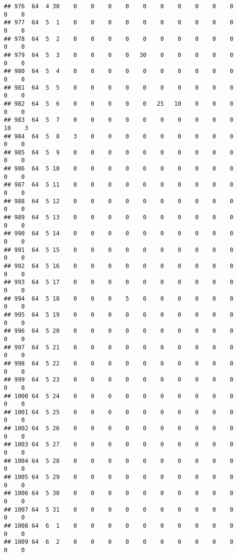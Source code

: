\documentclass[]{article}
\begin{document}
\begin{verbatim}
## 976  64  4 30    0    0    0    0    0    0    0    0    0    0    0    0
## 977  64  5  1    0    0    0    0    0    0    0    0    0    0    0    0
## 978  64  5  2    0    0    0    0    0    0    0    0    0    0    0    0
## 979  64  5  3    0    0    0    0   30    0    0    0    0    0    0    0
## 980  64  5  4    0    0    0    0    0    0    0    0    0    0    0    0
## 981  64  5  5    0    0    0    0    0    0    0    0    0    0    0    0
## 982  64  5  6    0    0    0    0    0   25   10    0    0    0    0    0
## 983  64  5  7    0    0    0    0    0    0    0    0    0    0   10    3
## 984  64  5  8    3    0    0    0    0    0    0    0    0    0    0    0
## 985  64  5  9    0    0    0    0    0    0    0    0    0    0    0    0
## 986  64  5 10    0    0    0    0    0    0    0    0    0    0    0    0
## 987  64  5 11    0    0    0    0    0    0    0    0    0    0    0    0
## 988  64  5 12    0    0    0    0    0    0    0    0    0    0    0    0
## 989  64  5 13    0    0    0    0    0    0    0    0    0    0    0    0
## 990  64  5 14    0    0    0    0    0    0    0    0    0    0    0    0
## 991  64  5 15    0    0    0    0    0    0    0    0    0    0    0    0
## 992  64  5 16    0    0    0    0    0    0    0    0    0    0    0    0
## 993  64  5 17    0    0    0    0    0    0    0    0    0    0    0    0
## 994  64  5 18    0    0    0    5    0    0    0    0    0    0    0    0
## 995  64  5 19    0    0    0    0    0    0    0    0    0    0    0    0
## 996  64  5 20    0    0    0    0    0    0    0    0    0    0    0    0
## 997  64  5 21    0    0    0    0    0    0    0    0    0    0    0    0
## 998  64  5 22    0    0    0    0    0    0    0    0    0    0    0    0
## 999  64  5 23    0    0    0    0    0    0    0    0    0    0    0    0
## 1000 64  5 24    0    0    0    0    0    0    0    0    0    0    0    0
## 1001 64  5 25    0    0    0    0    0    0    0    0    0    0    0    0
## 1002 64  5 26    0    0    0    0    0    0    0    0    0    0    0    0
## 1003 64  5 27    0    0    0    0    0    0    0    0    0    0    0    0
## 1004 64  5 28    0    0    0    0    0    0    0    0    0    0    0    0
## 1005 64  5 29    0    0    0    0    0    0    0    0    0    0    0    0
## 1006 64  5 30    0    0    0    0    0    0    0    0    0    0    0    0
## 1007 64  5 31    0    0    0    0    0    0    0    0    0    0    0    0
## 1008 64  6  1    0    0    0    0    0    0    0    0    0    0    0    0
## 1009 64  6  2    0    0    0    0    0    0    0    0    0    0    0    0

\end{verbatim}
\end{document}
